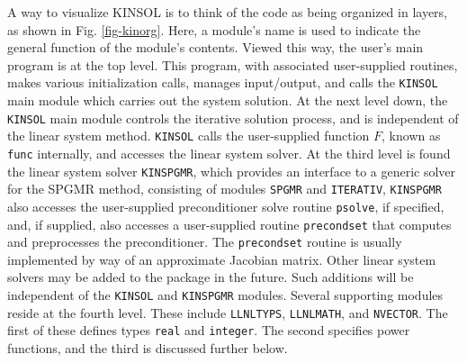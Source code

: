 \documentclass[11pt]{article}
\begin{document}
A way to visualize KINSOL is to think of the code as being organized
in layers, as shown in Fig. \ref{fig-kinorg}. Here, a module's name is used
to indicate the general function of the module's contents. Viewed
this way, the user's main program is at the top level. This program, with
associated user-supplied routines, makes various initialization calls, manages 
input/output, and calls the {\tt KINSOL} main module which carries out the 
system solution. At the next level 
down, the {\tt KINSOL} main module controls the iterative solution process, 
and is independent of the linear system method. {\tt KINSOL} calls the 
user-supplied function $F$, known as {\tt func} internally, and accesses the 
linear system solver. At the third level is found the linear system solver 
{\tt KINSPGMR}, which provides an interface to a generic solver for the SPGMR 
method, consisting of modules {\tt SPGMR} and {\tt ITERATIV}, {\tt KINSPGMR} 
also accesses the user-supplied preconditioner solve routine {\tt psolve}, if 
specified, and, if supplied, also accesses a user-supplied routine 
{\tt precondset} that computes and preprocesses the preconditioner. The 
{\tt precondset} routine is usually implemented by way of an approximate 
Jacobian matrix. Other linear system solvers may be added to the package in the
future. Such additions will be independent of the {\tt KINSOL} and 
{\tt KINSPGMR} modules. Several supporting modules reside at the fourth level.
These include {\tt LLNLTYPS}, {\tt LLNLMATH}, and {\tt NVECTOR}. The first of 
these defines types {\tt real} and {\tt integer}. The second specifies power 
functions, and the third is discussed further below.
\end{document}
